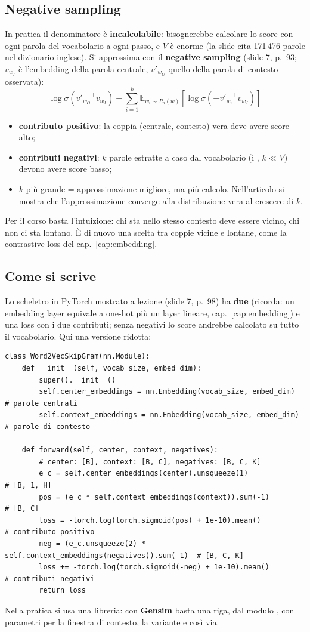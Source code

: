 \subsection{Negative sampling}
In pratica il denominatore è \textbf{incalcolabile}: bisognerebbe calcolare lo score con ogni parola del vocabolario a ogni passo, e
$V$ è enorme (la slide cita 171\,476 parole nel dizionario inglese). Si approssima con il \textbf{negative sampling} (slide 7, p.~93;
$v_{w_I}$ è l'embedding della parola centrale, $v'_{w_O}$ quello della parola di contesto osservata):
\[
  \log \sigma\!\left({v'_{w_O}}^{\top} v_{w_I}\right) + \sum_{i=1}^{k} \mathbb{E}_{w_i \sim P_n(w)}
  \left[\log \sigma\!\left(-{v'_{w_i}}^{\top} v_{w_I}\right)\right]
\]
\begin{itemize}
  \item \textbf{contributo positivo}: la coppia (centrale, contesto) vera deve avere score alto;
  \item \textbf{contributi negativi}: $k$ parole estratte a caso dal vocabolario (i , $k \ll V$) devono avere score basso;
  \item $k$ più grande = approssimazione migliore, ma più calcolo. Nell'articolo si mostra che l'approssimazione converge alla
        distribuzione vera al crescere di $k$.
\end{itemize}
Per il corso basta l'intuizione: chi sta nello stesso contesto deve essere vicino, chi non ci sta lontano.
È di nuovo una scelta tra coppie vicine e lontane, come la contrastive loss del cap.~\ref{cap:embedding}.

\subsection{Come si scrive}
Lo scheletro in PyTorch mostrato a lezione (slide 7, p.~98) ha \textbf{due } (ricorda: un embedding layer
equivale a one-hot più un layer lineare, cap.~\ref{cap:embedding}) e una loss con i due contributi; senza negativi lo score andrebbe
calcolato su tutto il vocabolario. Qui una versione ridotta:
\begin{lstlisting}
class Word2VecSkipGram(nn.Module):
    def __init__(self, vocab_size, embed_dim):
        super().__init__()
        self.center_embeddings = nn.Embedding(vocab_size, embed_dim)   # parole centrali
        self.context_embeddings = nn.Embedding(vocab_size, embed_dim)  # parole di contesto

    def forward(self, center, context, negatives):
        # center: [B], context: [B, C], negatives: [B, C, K]
        e_c = self.center_embeddings(center).unsqueeze(1)              # [B, 1, H]
        pos = (e_c * self.context_embeddings(context)).sum(-1)        # [B, C]
        loss = -torch.log(torch.sigmoid(pos) + 1e-10).mean()          # contributo positivo
        neg = (e_c.unsqueeze(2) * self.context_embeddings(negatives)).sum(-1)  # [B, C, K]
        loss += -torch.log(torch.sigmoid(-neg) + 1e-10).mean()        # contributi negativi
        return loss
\end{lstlisting}
Nella pratica si usa una libreria: con \textbf{Gensim} basta una riga,  dal modulo
, con parametri per la finestra di contesto, la variante e così via.

